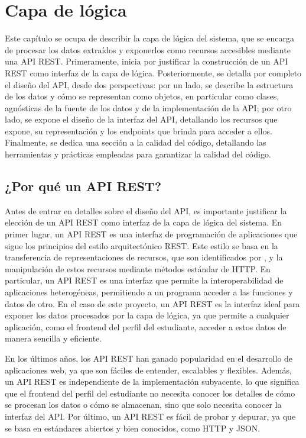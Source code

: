 \chapter{Capa de lógica}

Este capítulo se ocupa de describir la capa de lógica del sistema, que se encarga de procesar los datos extraídos y exponerlos como recursos accesibles mediante una \gls{API REST}. Primeramente, inicia por justificar la construcción de un API REST como interfaz de la capa de lógica. Posteriormente, se detalla por completo el diseño del API, desde dos perspectivas: por un lado, se describe la estructura de los datos y cómo se representan como objetos, en particular como clases, agnósticas de la fuente de los datos y de la implementación de la API; por otro lado, se expone el diseño de la interfaz del API, detallando los recursos que expone, su representación y los endpoints que brinda para acceder a ellos. Finalmente, se dedica una sección a la calidad del código, detallando las herramientas y prácticas empleadas para garantizar la calidad del código.

\section{¿Por qué un API REST?}

Antes de entrar en detalles sobre el diseño del API, es importante justificar la elección de un API REST como interfaz de la capa de lógica del sistema. En primer lugar, un API REST es una interfaz de programación de aplicaciones que sigue los principios del estilo arquitectónico \gls{REST}. Este estilo se basa en la transferencia de representaciones de recursos, que son identificados por , y la manipulación de estos recursos mediante métodos estándar de \gls{HTTP}. En particular, un API REST es una interfaz que permite la interoperabilidad de aplicaciones heterogéneas, permitiendo a un programa acceder a las funciones y datos de otro. En el caso de este proyecto, un API REST es la interfaz ideal para exponer los datos procesados por la capa de lógica, ya que permite a cualquier aplicación, como el frontend del perfil del estudiante, acceder a estos datos de manera sencilla y eficiente.

En los últimos años, los API REST han ganado popularidad en el desarrollo de aplicaciones web, ya que son fáciles de entender, escalables y flexibles. Además, un API REST es independiente de la implementación subyacente, lo que significa que el frontend del perfil del estudiante no necesita conocer los detalles de cómo se procesan los datos o cómo se almacenan, sino que solo necesita conocer la interfaz del API. Por último, un API REST es fácil de probar y depurar, ya que se basa en estándares abiertos y bien conocidos, como \gls{HTTP} y \gls{JSON}.

